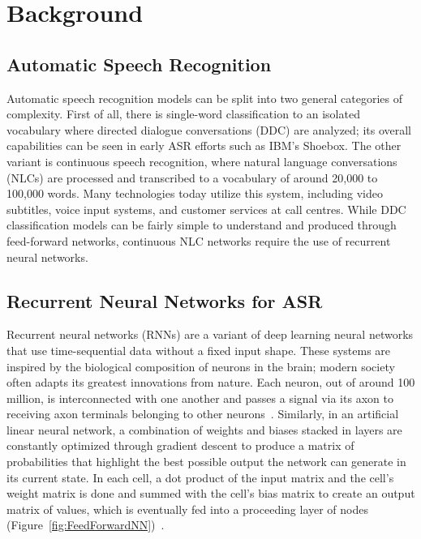 
\chapter{Background} %

\label{Background} %


\section{Automatic Speech Recognition}

Automatic speech recognition models can be split into two general categories of complexity. First of all, there is single-word classification to an isolated vocabulary where directed dialogue conversations (DDC) are analyzed; its overall capabilities can be seen in early ASR efforts such as IBM’s Shoebox. The other variant is continuous speech recognition, where natural language conversations (NLCs) are processed and transcribed to a vocabulary of around 20,000 to 100,000 words. Many technologies today utilize this system, including video subtitles, voice input systems, and customer services at call centres. While DDC classification models can be fairly simple to understand and produced through feed-forward networks, continuous NLC networks require the use of recurrent neural networks.

\section{Recurrent Neural Networks for ASR}

Recurrent neural networks (RNNs) are a variant of deep learning neural networks that use time-sequential data without a fixed input shape. These systems are inspired by the biological composition of neurons in the brain; modern society often adapts its greatest innovations from nature. Each neuron, out of around 100 million, is interconnected with one another and passes a signal via its axon to receiving axon terminals belonging to other neurons~\cite{koehn_2020}. Similarly, in an artificial linear neural network, a combination of weights and biases stacked in layers are constantly optimized through gradient descent to produce a matrix of probabilities that highlight the best possible output the network can generate in its current state. In each cell, a dot product of the input matrix and the cell’s weight matrix is done and summed with the cell’s bias matrix to create an output matrix of values, which is eventually fed into a proceeding layer of nodes (Figure~\ref{fig:FeedForwardNN})~\cite{koehn_2020}.

